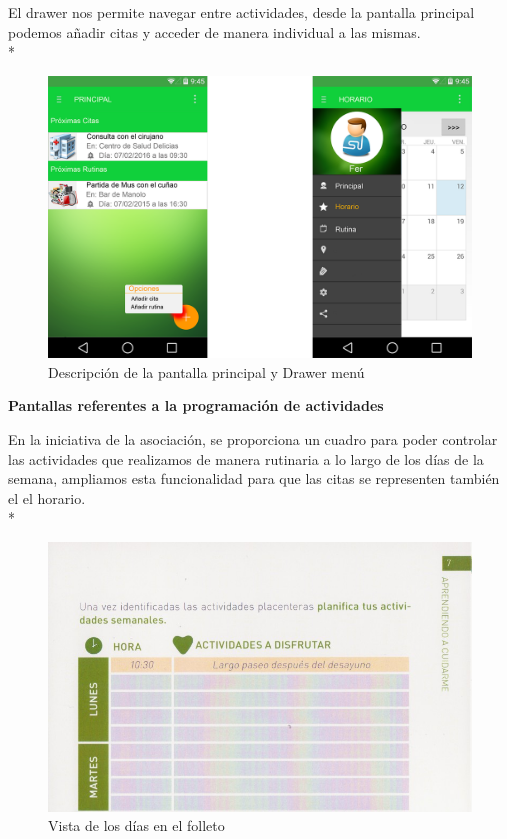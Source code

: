 \documentclass[../pfc.tex]{subfiles}
\begin{document}
		El drawer nos permite navegar entre actividades, desde la pantalla principal podemos añadir citas y acceder de manera individual a las mismas.\\*
	 
		
		\begin{figure}[H]
			\centering
			\includegraphics[width=0.8\linewidth]{../images/principal_2}
			\caption[Drawer menú y Pantalla principal]{Descripción de la pantalla principal y Drawer menú}
			\label{fig:principal}
		\end{figure}
		
		
		\textbf{Pantallas referentes a la programación de actividades}
		
		En la iniciativa de la asociación, se proporciona un cuadro para poder controlar las actividades que realizamos de manera rutinaria a lo largo de los días de la semana, ampliamos esta funcionalidad para que las citas se representen también el el horario.\\*
		
			\begin{figure}[H]
				\centering
				\includegraphics[width=0.7\linewidth]{../folleto/007_corto}
				\caption{Vista de los días en el folleto}
				\label{fig:horario_corto}
			\end{figure}
		
\end{document}
